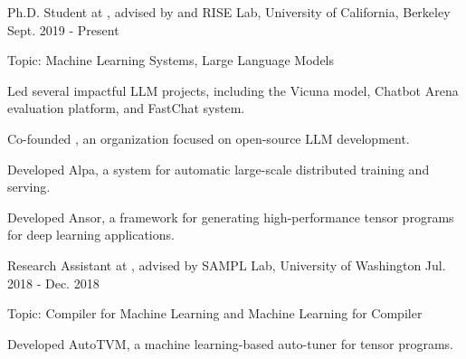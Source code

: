 

\begin{cventries}


\cventry
	{Ph.D. Student at , advised by 
     and
    } %
	{RISE Lab, University of California, Berkeley} %
	{Sept. 2019 - Present} %
	{} %
	{
		\begin{cvitems} %
			\item{Topic: Machine Learning Systems, Large Language Models}
			\item{Led several impactful LLM projects, including the Vicuna model, Chatbot Arena evaluation platform, and FastChat system.}
			\item{Co-founded , an organization focused on open-source LLM development.}
			\item{Developed Alpa, a system for automatic large-scale distributed training and serving.}
			\item{Developed Ansor, a framework for generating high-performance tensor programs for deep learning applications.}
		\end{cvitems}
	}


\cventry
	{Research Assistant at , advised by } %
	{SAMPL Lab, University of Washington} %
	{Jul. 2018 - Dec. 2018} %
	{} %
	{
		\begin{cvitems} %
			\item{Topic: Compiler for Machine Learning and Machine Learning for Compiler}
			\item{Developed AutoTVM, a machine learning-based auto-tuner for tensor programs.}
		\end{cvitems}
	}


\end{cventries}
